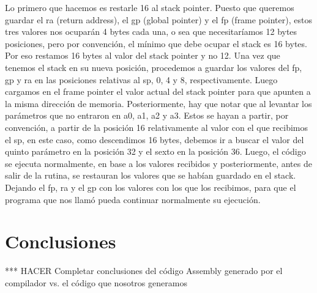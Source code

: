 \documentclass[a4paper,10pt]{article}
\begin{document}
Lo primero que hacemos es restarle 16 al stack pointer. Puesto que queremos guardar el ra (return address), el gp (global pointer) y el fp (frame pointer), estos tres valores nos ocupar\'an 4 bytes cada una, o sea que necesitar\'iamos 12 bytes posiciones, pero por convenci\'on, el m\'inimo que debe ocupar el stack es 16 bytes. Por eso restamos 16 bytes al valor del stack pointer y no 12.
Una vez que tenemos el stack en su nueva posici\'on, procedemos a guardar los valores del fp, gp y ra en las posiciones relativas al sp, 0, 4 y 8, respectivamente. Luego cargamos en el frame pointer el valor actual del stack pointer para que apunten a la misma direcci\'on de memoria.
Posteriormente, hay que notar que al levantar los par\'ametros que no entraron en a0, a1, a2 y a3. Estos se hayan a partir, por convenci\'on, a partir de la posici\'on 16 relativamente al valor con el que recibimos el sp, en este caso, como descendimos 16 bytes, debemos ir a buscar el valor del quinto par\'ametro en la posici\'on 32 y el sexto en la posici\'on 36.
Luego, el c\'odigo se ejecuta normalmente, en base a los valores recibidos y posteriormente, antes de salir de la rutina, se restauran los valores que se hab\'ian guardado en el stack. Dejando el fp, ra y el gp con los valores con los que los recibimos, para que el programa que nos llam\'o pueda continuar normalmente su ejecuci\'on.

\section{Conclusiones}
*** HACER
Completar conclusiones del c\'odigo Assembly generado por el compilador vs. el c\'odigo que nosotros generamos
\end{document}
